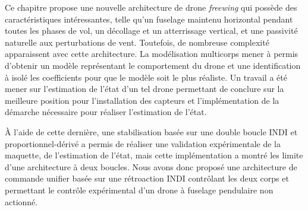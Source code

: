 Ce chapitre propose une nouvelle architecture de drone \textit{freewing} qui possède des caractéristiques intéressantes, telle qu'un fuselage maintenu horizontal pendant toutes les phases de vol, un décollage et un atterrissage vertical, et une passivité naturelle aux perturbations de vent. Toutefois, de nombreuse complexité apparaissent avec cette architecture. La modélisation multicorps mener à permis d'obtenir un modèle représentant le comportement du drone et une identification à isolé les coefficients pour que le modèle soit le plus réaliste. Un travail a été mener sur l'estimation de l'état d'un tel drone permettant de conclure sur la meilleure position pour l'installation des capteurs et l'implémentation de la démarche nécessaire pour réaliser l'estimation de l'état. 

À l'aide de cette dernière, une stabilisation basée sur une double boucle INDI et proportionnel-dérivé a permis de réaliser une validation expérimentale de la maquette, de l'estimation de l'état, mais cette implémentation a montré les limite d'une architecture à deux boucles. Nous avons donc proposé une architecture de commande unifier basée sur une rétroaction INDI contrôlant les deux corps et permettant le contrôle expérimental d'un drone à fuselage pendulaire non actionné.







